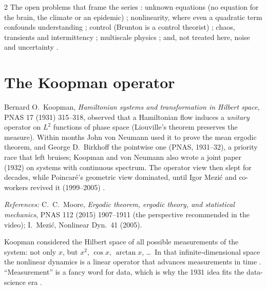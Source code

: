 \begin{paracol}{2}
The open problems that frame the series : unknown equations (no equation for the brain, the
climate or an epidemic) ; nonlinearity, where even a quadratic term confounds understanding
; control (Brunton is a control theorist) ; chaos, transients and intermittency
; multiscale physics ; and, not treated here, noise and uncertainty .

\section{The Koopman operator}\label{sec:ko-operator}

\Needspace*{10.5cm}\begin{history}
Bernard O.~Koopman, \emph{Hamiltonian systems and transformation in Hilbert space}, PNAS 17 (1931) 315--318,
observed that a Hamiltonian flow induces a \emph{unitary} operator on $L^2$ functions of phase space
(Liouville's theorem preserves the measure). Within months John von Neumann used it to prove the mean
ergodic theorem, and George D.~Birkhoff the pointwise one (PNAS, 1931--32), a priority race that left
bruises; Koopman and von Neumann also wrote a joint paper (1932) on systems with continuous spectrum. The
operator view then slept for decades, while Poincar\'e's geometric view dominated, until Igor Mezi\'c and
co-workers revived it (1999--2005) .\par
\textit{References:} C.~C.~Moore, \emph{Ergodic theorem, ergodic theory, and statistical mechanics},
PNAS 112 (2015) 1907--1911 (the perspective recommended in the video); I.~Mezi\'c, Nonlinear Dyn.\ 41 (2005).
\end{history}

Koopman considered the Hilbert space of all possible measurements of the system: not only $x$, but $x^2$,
$\cos x$, $\arctan x$, \dots\ In that infinite-dimensional space the nonlinear dynamics is a linear operator
that advances measurements in time . ``Measurement'' is a fancy
word for data, which is why the 1931 idea fits the data-science era .


\end{paracol}

